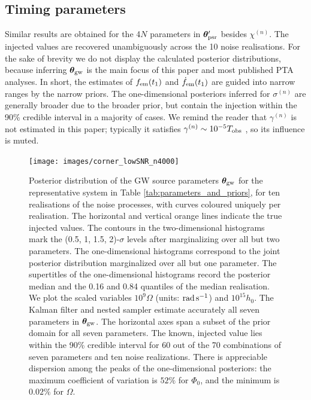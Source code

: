 \documentclass[fleqn,usenatbib,useAMS]{mnras}
\begin{document}
\subsection{Timing parameters} \label{sec:timing_parameters}
Similar results are obtained for the 4$N$ parameters in $\boldsymbol{\theta}_{\rm psr}'$ besides $\chi^{(n)}$. The injected values are recovered unambiguously across the 10 noise realisations. For the sake of brevity we do not display the calculated posterior distributions, because inferring $\boldsymbol{\theta}_{\rm gw}$ is the main focus of this paper and most published PTA analyses. In short, the estimates of $f_{\rm em}(t_1)$ and $\dot{f}_{\rm em}(t_1)$ are guided into narrow ranges by the narrow priors. The one-dimensional posteriors inferred for $\sigma^{(n)}$ are generally broader due to the broader prior, but contain the injection within the  90\% credible interval in a majority of cases. We remind the reader that $\gamma^{(n)}$ is not estimated in this paper; typically it satisfies $\gamma^{(n)} \sim 10^{-5} T_{\rm obs}$ \citep{Price2012,Myers2021MNRAS.502.3113M,Meyers2021,Vargas}, so its influence is muted. \newline 



  

\begin{figure}
	\texttt{[image: images/corner\_lowSNR\_n4000]}
	\caption{Posterior distribution of the GW source parameters $\boldsymbol{\theta}_{\rm gw}$ for the representative system in Table \ref{tab:parameters_and_priors}, for ten realisations of the noise processes, with curves coloured uniquely per realisation. The horizontal and vertical orange lines indicate the true injected values. The contours in the two-dimensional histograms mark the (0.5, 1, 1.5, 2)-$\sigma$ levels after marginalizing over all but two parameters. The one-dimensional histograms correspond to the joint posterior distribution marginalized over all but one parameter. The supertitles of the one-dimensional histograms record the posterior median and the 0.16 and 0.84 quantiles of the median realisation. We plot the scaled variables $10^9 \Omega$ (units: ${\rm rad \, s^{-1}}$) and $10^{15} h_0$. The Kalman filter and nested sampler estimate accurately all seven parameters in ${\boldsymbol{\theta}}_{\rm gw}$. The horizontal axes span a subset of the prior domain for all seven parameters. The known, injected value lies within the 90\% credible interval for 60 out of the 70 combinations of seven parameters and ten noise realizations. There is appreciable dispersion among the peaks of the one-dimensional posteriors: the maximum coefficient of variation is $52 \%$ for $\Phi_0$, and the minimum is $0.02 \%$ for $\Omega$.}
	\label{fig:corner_plot_1}
\end{figure}
\end{document}
